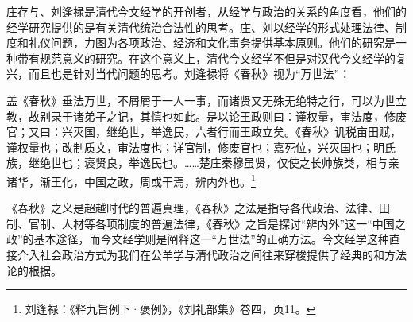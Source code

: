 \documentclass[a4paper, 12pt, openright]{ctexbook}
\renewenvironment{quote}
  {\list{}{\rightmargin2\ccwd \leftmargin2\ccwd \itemindent=2\ccwd \listparindent=2\ccwd}%
   \item\relax\small\kaishu\color{black}}
  {\endlist}
\begin{document}
庄存与、刘逢禄是清代今文经学的开创者，从经学与政治的关系的角度看，他们的经学研究提供的是有关清代统治合法性的思考。庄、刘以经学的形式处理法律、制度和礼仪问题，力图为各项政治、经济和文化事务提供基本原则。他们的研究是一种带有规范意义的研究。在这个意义上，清代今文经学不但是对汉代今文经学的复兴，而且也是针对当代问题的思考。刘逢禄将《春秋》视为“万世法”：

\begin{quote}
盖《春秋》垂法万世，不屑屑于一人一事，而诸贤又无殊无绝特之行，可以为世立教，故别录于诸弟子之记，其慎也如此。是以论王政则曰：谨权量，审法度，修废官；又曰：兴灭国，继绝世，举逸民，六者行而王政立矣。《春秋》讥税亩田赋，谨权量也；改制质文，审法度也；详官制，修废官也；嘉死位，兴灭国也；明氏族，继绝世也；褒贤良，举逸民也。……楚庄秦穆虽贤，仅使之长帅族类，相与亲诸华，渐王化，中国之政，周或干焉，辨内外也。\footnote{刘逢禄：《释九旨例下·褒例》，《刘礼部集》卷四，页11。}
\end{quote}

《春秋》之义是超越时代的普遍真理，《春秋》之法是指导各代政治、法律、田制、官制、人材等各项制度的普遍法律，《春秋》之旨是探讨“辨内外”这一“中国之政”的基本途径，而今文经学则是阐释这一“万世法”的正确方法。今文经学这种直接介入社会政治方式为我们在公羊学与清代政治之间往来穿梭提供了经典的和方法论的根据。
\end{document}
